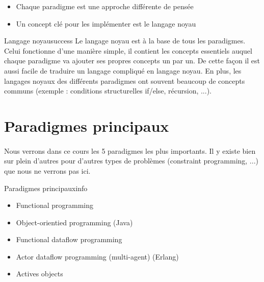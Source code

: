       \begin{itemize}[label=\textbullet, font=\small]
        \item Chaque paradigme est une approche différente de pensée
        \item Un concept clé pour les implémenter est le {\color{danger} langage noyau}
      \end{itemize}

      \tboxspace

      \begin{titletbox}{Langage noyau}{success}
        Le langage noyau est à la base de tous les paradigmes. Celui fonctionne d'une manière simple, il contient les
        concepts essentiels auquel chaque paradigme va ajouter ses propres concepts un par un. De cette façon il est
        aussi facile de traduire un langage compliqué en langage noyau. En plus, les langages noyaux des différents
        paradigmes ont souvent beaucoup de concepts communs (exemple : conditions structurelles if/else, récursion, ...).
      \end{titletbox}

  \section{Paradigmes principaux}

      \paragraph{}Nous verrons dans ce cours les 5 paradigmes les plus importants. Il y existe bien sur plein d'autres
      pour d'autres types de problèmes (constraint programming, ...) que nous ne verrons pas ici.

      \tboxspace

      \begin{titletbox}{Paradigmes principaux}{info}
        \begin{itemize}[label=\textbullet, font=\small]
          \item Functional programming
          \item Object-orientied programming (Java)
          \item Functional dataflow programming
          \item Actor dataflow programming (multi-agent) (Erlang)
          \item Actives objects
        \end{itemize}
      \end{titletbox}

